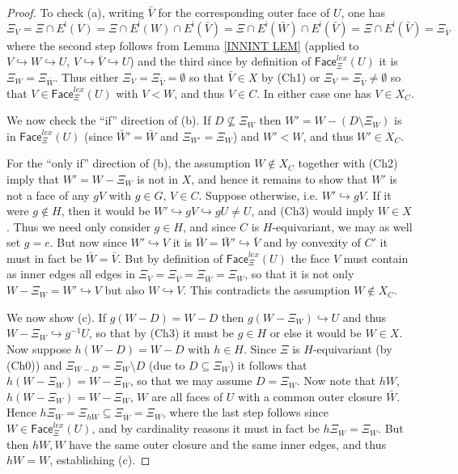\documentclass[a4paper,10pt,draft]{article}%
\begin{document}
\begin{proof}
To check (a), writing $\bar{V}$ for the corresponding outer face of $U$, one has
	\[
	\Xi_V = \Xi \cap E^{\mathsf{i}} (V) 
	= \Xi \cap E^{\mathsf{i}}(W) \cap E^{\mathsf{i}}(\bar{V})
	= \Xi \cap E^{\mathsf{i}}(\bar{W}) \cap E^{\mathsf{i}}(\bar{V})
	= \Xi \cap E^{\mathsf{i}}(\bar{V})
	= \Xi_{\bar{V}}
	\]
where the second step follows from Lemma \ref{INNINT LEM}
(applied to $V \hookrightarrow W \hookrightarrow U$, 
$V \hookrightarrow \bar{V} \hookrightarrow U$)
and the third since by definition of
$\mathsf{Face}_{\Xi}^{lex}(U)$ it is $\Xi_{W} = \Xi_{\bar{W}}$.
Thus either $\Xi_V= \Xi_{\bar{V}} = \emptyset$ so that $\bar{V}\in X$ by (Ch1) 
or $\Xi_V = \Xi_{\bar{V}} \neq \emptyset$
so that $V \in \mathsf{Face}_{\Xi}^{lex}(U)$ with $V<W$, and thus $V\in C$. In either case one has $V \in X_C$.

We now check the ``if'' direction of (b).
If $D \not \subseteq \Xi_{W}$
then $W' = W - (D \setminus \Xi_{W})$
is in $\mathsf{Face}_{\Xi}^{lex}(U)$
(since $\bar{W}' = \bar{W}$ and $\Xi_{W'} = \Xi_{W}$)
and $W'<W$, and thus $W' \in X_C$.

For the ``only if'' direction of (b), the assumption $W \not \in X_C$ together with (Ch2) imply that
$W'=W-\Xi_{W}$ is not in $X$, and hence it remains to show that 
$W'$ is not a face of any $gV$ with $g\in G$, $V \in C$.
Suppose otherwise, i.e. $W' \hookrightarrow gV$.
If it were $g \not \in H$, 
then it would be $W' \hookrightarrow gV \hookrightarrow g U \neq U$, and (Ch3) would imply $W\in X$. Thus we need only consider $g\in H$, and since $C$ is $H$-equivariant, we may as well set $g=e$.
But now since $W' \hookrightarrow V$ it is $ \bar{W} = \bar{W}' \hookrightarrow \bar{V}$
and by convexity of $C'$ it must in fact be 
$ \bar{W} = \bar{V}$. But by definition of 
$\mathsf{Face}_{\Xi}^{lex}(U)$ the face $V$ must contain as inner edges all edges in 
$\Xi_V=\Xi_{\bar{V}} = \Xi_{\bar{W}} = \Xi_{W}$,
so that it is not only $W - \Xi_{W} = W' \hookrightarrow V$ but also $W \hookrightarrow V$.
This contradicts the assumption $W \not \in X_C$.

We now show (c).
If $g(W-D)=W-D$ then $g(W - \Xi_W) \hookrightarrow U$
and thus $W - \Xi_W \hookrightarrow g^{-1}U$,
so that by (Ch3) it must be $g \in H$ or else it would be $W \in X$.
Now suppose $h(W-D)=W-D$ with $h\in H$.
Since $\Xi$ is $H$-equivariant (by (Ch0)) and
$\Xi_{W-D} = \Xi_{W} \setminus D$ (due to $D \subseteq \Xi_{W}$) it follows that 
$h(W-\Xi_W)=W-\Xi_W$,
so that we may assume $D=\Xi_W$.
Now note that
$hW$, $h(W-\Xi_W)=W-\Xi_W$, $W$
are all faces of $U$ with a common outer closure $\bar{W}$.
Hence 
$h\Xi_{W} = \Xi_{hW} \subseteq \Xi_{\bar{W}} = \Xi_{W}$, where the last step follows since
$W \in \mathsf{Face}_{\Xi}^{lex}(U)$, and by cardinality reasons it must in fact be $h \Xi_{W} = \Xi_{W}$. But then $hW,W$
have the same outer closure and the same inner edges, and thus 
$hW=W$, establishing (c).


\end{proof}
\end{document}
